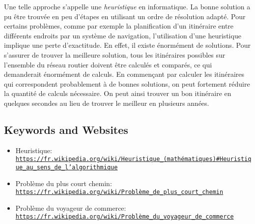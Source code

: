 \documentclass[a4paper,11pt]{report}
\newcommand{\BrochureUrlText}[1]{\texttt{#1}}
\begin{document}
Une telle approche s’appelle une \emph{heuristique} en informatique. La bonne solution a pu être trouvée en peu d’étapes en utilisant un ordre de résolution adapté. Pour certains problèmes, comme par exemple la planification d’un itinéraire entre différents endroits par un système de navigation, l’utilisation d’une heuristique implique une perte d’exactitude. En effet, il existe énormément de solutions. Pour s’assurer de trouver la meilleure solution, tous les itinéraires possibles sur l’ensemble du réseau routier doivent être calculés et comparés, ce qui demanderait énormément de calculs. En commençant par calculer les itinéraires qui correspondent probablement à de bonnes solutions, on peut fortement réduire la quantité de calculs nécessaire. On peut ainsi trouver un bon itinéraire en quelques secondes au lieu de trouver le meilleur en plusieurs années.

{\raggedright

\subsection*{Keywords and Websites}

\begin{itemize}
  \item Heuristique: \href{https://fr.wikipedia.org/wiki/Heuristique_(math\%C3\%A9matiques)\#Heuristique_au_sens_de_l'algorithmique}{\BrochureUrlText{https://fr.wikipedia.org/wiki/Heuristique\_(mathématiques)\#Heuristique\_au\_sens\_de\_l’algorithmique}}
  \item Problème du plus court chemin: \href{https://fr.wikipedia.org/wiki/Probl\%C3\%A8me_de_plus_court_chemin}{\BrochureUrlText{https://fr.wikipedia.org/wiki/Problème\_de\_plus\_court\_chemin}}
  \item Problème du voyageur de commerce: \href{https://fr.wikipedia.org/wiki/Probl\%C3\%A8me_du_voyageur_de_commerce}{\BrochureUrlText{https://fr.wikipedia.org/wiki/Problème\_du\_voyageur\_de\_commerce}}
\end{itemize}


}
\end{document}
